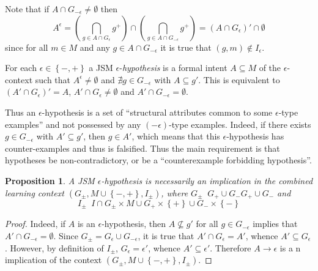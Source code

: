 \documentclass[a4paper]{article}
\newcommand{\obj}[1]{{\left\{ #1 \right \}}}
\newcommand{\brac}[1]{{\left ( #1 \right )}}
\newtheorem{prop}{Proposition}
\newcommand{\defn}{\mathop{\overset{\Delta}{=}}\nolimits}
\begin{document}
Note that if $A\cap G_{-\epsilon} \neq \emptyset$ then \[A^\epsilon = \brac{ \bigcap_{g\in A\cap G_\epsilon} g^+ }\cap \brac{ \bigcap_{g\in A\cap G_{-\epsilon}} g^+ } = \brac{A\cap G_\epsilon}' \cap \emptyset\] since for all $m\in M$ and any $g\in A\cap G_{-\epsilon}$ it is true that $(g,m)\notin I_\epsilon$.

For each $\epsilon\in \obj{-,+}$ a JSM $\epsilon$-\emph{hypothesis} is a formal intent $A\subseteq M$ of the $\epsilon$-context such that $A^\epsilon\neq \emptyset$ and $\nexists g\in G_{-\epsilon}$ with $A\subseteq g'$. This is equivalent to $\brac{A'\cap G_\epsilon}' = A$, $A'\cap G_\epsilon\neq \emptyset$ and $A'\cap G_{-\epsilon} = \emptyset$.

Thus an $\epsilon$-hypothesis is a set of ``structural attributes common to some $\epsilon$-type examples'' and not possessed by any $(-\epsilon)$-type examples. Indeed, if there exists $g\in G_{-\epsilon}$ with $A'\subseteq g'$, then $g\in A'$, which means that this $\epsilon$-hypothesis has counter-examples and thus is falsified. Thus the main requirement is that hypotheses be non-contradictory, or be a ``counterexample forbidding hypothesis''.

\begin{prop} A JSM $\epsilon$-hypothesis is necessarily an implication in the combined learning context $\brac{ G_\pm, M \cup \obj{-,+}, I_\pm }$, where $G_\pm \defn G_+\cup G_-G_+\cup G_-$ and \[I_\pm \defn I\cap G_\pm\times M \cup G_+\times\obj{+} \cup G_-\times\obj{-}\]
\end{prop}

\begin{proof}
Indeed, if $A$ is an $\epsilon$-hypothesis, then $A\not\subseteq g'$ for all $g\in G_{-\epsilon}$ implies that $A'\cap G_{-\epsilon} = \emptyset$. Since $G_\pm = G_\epsilon \cup G_{-\epsilon}$, it is true that $A'\cap G_\epsilon = A'$, whence $A'\subseteq G_\epsilon$. However, by definition of $I_\pm$, $G_\epsilon = \epsilon'$, whence $A'\subseteq \epsilon'$. Therefore $A\to \epsilon$ is a n implication of the context $\brac{ G_\pm, M \cup \obj{-,+}, I_\pm}$.
\end{proof}

\end{document}

